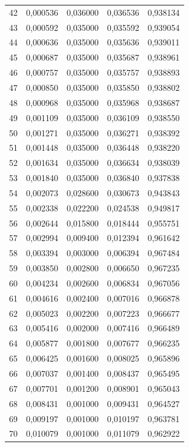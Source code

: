 \begin{small}
\begin{longtable}{rrrrr}
42 & 0,000536 & 0,036000 & 0,036536 & 0,938134 \\
43 & 0,000592 & 0,035000 & 0,035592 & 0,939054 \\
44 & 0,000636 & 0,035000 & 0,035636 & 0,939011 \\
45 & 0,000687 & 0,035000 & 0,035687 & 0,938961 \\
46 & 0,000757 & 0,035000 & 0,035757 & 0,938893 \\
47 & 0,000850 & 0,035000 & 0,035850 & 0,938802 \\
48 & 0,000968 & 0,035000 & 0,035968 & 0,938687 \\
49 & 0,001109 & 0,035000 & 0,036109 & 0,938550 \\
50 & 0,001271 & 0,035000 & 0,036271 & 0,938392 \\
51 & 0,001448 & 0,035000 & 0,036448 & 0,938220 \\
52 & 0,001634 & 0,035000 & 0,036634 & 0,938039 \\
53 & 0,001840 & 0,035000 & 0,036840 & 0,937838 \\
54 & 0,002073 & 0,028600 & 0,030673 & 0,943843 \\
55 & 0,002338 & 0,022200 & 0,024538 & 0,949817 \\
56 & 0,002644 & 0,015800 & 0,018444 & 0,955751 \\
57 & 0,002994 & 0,009400 & 0,012394 & 0,961642 \\
58 & 0,003394 & 0,003000 & 0,006394 & 0,967484 \\
59 & 0,003850 & 0,002800 & 0,006650 & 0,967235 \\
60 & 0,004234 & 0,002600 & 0,006834 & 0,967056 \\
61 & 0,004616 & 0,002400 & 0,007016 & 0,966878 \\
62 & 0,005023 & 0,002200 & 0,007223 & 0,966677 \\
63 & 0,005416 & 0,002000 & 0,007416 & 0,966489 \\
64 & 0,005877 & 0,001800 & 0,007677 & 0,966235 \\
65 & 0,006425 & 0,001600 & 0,008025 & 0,965896 \\
66 & 0,007037 & 0,001400 & 0,008437 & 0,965495 \\
67 & 0,007701 & 0,001200 & 0,008901 & 0,965043 \\
68 & 0,008431 & 0,001000 & 0,009431 & 0,964527 \\
69 & 0,009197 & 0,001000 & 0,010197 & 0,963781 \\
70 & 0,010079 & 0,001000 & 0,011079 & 0,962922 \\

\end{longtable}
\end{small}
